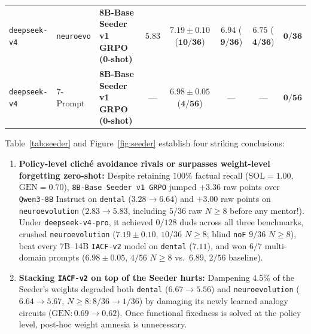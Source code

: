 \documentclass[10.5pt,letterpaper]{article}
\begin{document}
\begin{table}[t]
{\begin{tabular}{@{}l l l c c c c c@{}}
\rowcolor{softteal}
\texttt{deepseek-v4} & \texttt{neuroevo} & \textbf{8B-Base Seeder v1 GRPO (0-shot)} & $\mathbf{5.83}$ & $\mathbf{7.19 \pm 0.10}$ ($\mathbf{10/36}$) & $\mathbf{6.94}$ ($\mathbf{9/36}$) & $\mathbf{6.75}$ ($\mathbf{4/36}$) & $\mathbf{0/36}$ \\
\rowcolor{softteal}
\texttt{deepseek-v4} & 7-Prompt & \textbf{8B-Base Seeder v1 GRPO (0-shot)} & --- & $\mathbf{6.98 \pm 0.05}$ ($\mathbf{4/56}$) & --- & --- & $\mathbf{0/56}$ \\
\bottomrule
\end{tabular}%
}
\end{table}

Table~\ref{tab:seeder} and Figure~\ref{fig:seeder} establish four striking conclusions:
\begin{enumerate}
  \item \textbf{Policy-level cliché avoidance rivals or surpasses weight-level forgetting zero-shot:} Despite retaining $100\%$ factual recall ($\text{SOL}\!=\!1.00$, $\text{GEN}\!=\!0.70$), \texttt{8B-Base Seeder v1 GRPO} jumped $+3.36$ raw points over \texttt{Qwen3-8B} Instruct on \texttt{dental} ($3.28 \to 6.64$) and $+3.00$ raw points on \texttt{neuroevolution} ($2.83 \to 5.83$, including $5/36$ raw $N\!\ge\!8$ before any mentor!). Under \texttt{deepseek-v4-pro}, it achieved $0/128$ duds across all three benchmarks, crushed \texttt{neuroevolution} ($7.19 \pm 0.10$, $10/36$ $N\!\ge\!8$; blind \texttt{noF} $9/36$ $N\!\ge\!8$), beat every 7B--14B \texttt{IACF-v2} model on \texttt{dental} ($7.11$), and won $6/7$ multi-domain prompts ($6.98 \pm 0.05$, $4/56$ $N\!\ge\!8$ vs.\ $6.89$, $2/56$ baseline).
  \item \textbf{Stacking \texttt{IACF-v2} on top of the Seeder hurts:} Dampening $4.5\%$ of the Seeder's weights degraded both \texttt{dental} ($6.67 \to 5.56$) and \texttt{neuroevolution} ($6.64 \to 5.67$, $N\!\ge\!8: 8/36 \to 1/36$) by damaging its newly learned analogy circuits ($\text{GEN}: 0.69 \to 0.62$). Once functional fixedness is solved at the policy level, post-hoc weight amnesia is unnecessary.

\end{enumerate}
\end{document}
